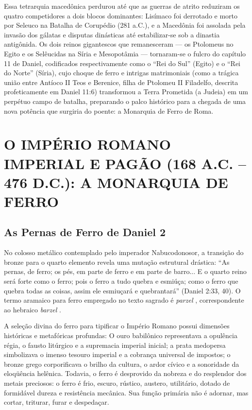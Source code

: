 \documentclass[11pt,a4paper,openany]{book}
\begin{document}
Essa tetrarquia macedônica perdurou até que as guerras de atrito reduziram os quatro competidores a dois blocos dominantes: Lisímaco foi derrotado e morto por Seleuco na Batalha de Corupédio (281 a.C.), e a Macedônia foi assolada pela invasão dos gálatas e disputas dinásticas até estabilizar-se sob a dinastia antigônida. Os dois reinos gigantescos que remanesceram — os Ptolomeus no Egito e os Selêucidas na Síria e Mesopotâmia — tornaram-se o fulcro do capítulo 11 de Daniel, codificados respectivamente como o ``Rei do Sul'' (Egito) e o ``Rei do Norte'' (Síria), cujo choque de ferro e intrigas matrimoniais (como a trágica união entre Antíoco II Teos e Berenice, filha de Ptolomeu II Filadelfo, descrita profeticamente em Daniel 11:6) transformou a Terra Prometida (a Judeia) em um perpétuo campo de batalha, preparando o palco histórico para a chegada de uma nova potência que surgiria do poente: a Monarquia de Ferro de Roma.



\section{O IMPÉRIO ROMANO IMPERIAL E PAGÃO (168 A.C. – 476 D.C.): A MONARQUIA DE FERRO}



\subsection{As Pernas de Ferro de Daniel 2}


No colosso metálico contemplado pelo imperador Nabucodonosor, a transição do bronze para o quarto elemento revela uma mutação estrutural drástica:
``As pernas, de ferro; os pés, em parte de ferro e em parte de barro... E o quarto reino será forte como o ferro; pois o ferro a tudo quebra e esmiúça; como o ferro que quebra todas as coisas, assim ele esmiuçará e quebrantará'' (Daniel 2:33, 40).
O termo aramaico para ferro empregado no texto sagrado é \textit{parzel} , correspondente ao hebraico \textit{barzel} .

A seleção divina do ferro para tipificar o Império Romano possui dimensões históricas e metafóricas profundas:
O ouro babilônico representava a opulência régia, o fausto litúrgico e a supremacia imperial inicial; a prata medopersa simbolizava o imenso tesouro imperial e a cobrança universal de impostos; o bronze grego corporificava o brilho da cultura, o ardor cívico e a sonoridade da eloqüência helênica. Todavia, o ferro é desprovido da nobreza e do resplendor dos metais preciosos: o ferro é frio, escuro, rústico, austero, utilitário, dotado de formidável dureza e resistência mecânica. Sua função primária não é adornar, mas cortar, triturar, furar e despedaçar.
\end{document}
